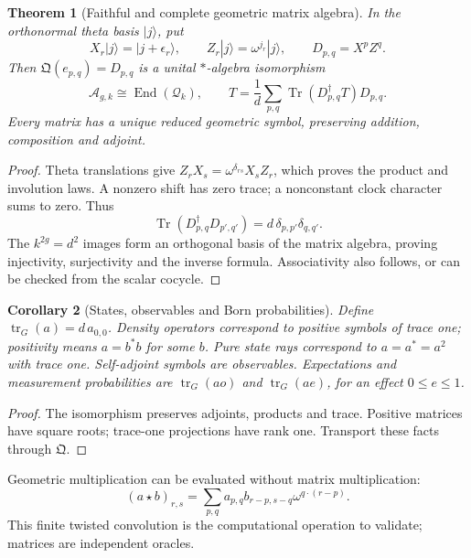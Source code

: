 \documentclass[11pt]{article}
\newtheorem{theorem}{Theorem}[section]
\newtheorem{corollary}[theorem]{Corollary}
\theoremstyle{definition}
\theoremstyle{remark}
\newcommand{\Tr}{\operatorname{Tr}}
\begin{document}
\begin{theorem}[Faithful and complete geometric matrix algebra]\label{thm:full-algebra}
In the orthonormal theta basis $|j\rangle$, put
\[
 X_r|j\rangle=|j+\epsilon_r\rangle,\qquad
 Z_r|j\rangle=\omega^{j_r}|j\rangle,\qquad D_{p,q}=X^pZ^q.
\]
Then $\mathfrak Q(e_{p,q})=D_{p,q}$ is a unital $*$-algebra isomorphism
\[
 \mathcal A_{g,k}\cong\operatorname{End}(\mathcal Q_k),\qquad
 T=\frac1d\sum_{p,q}\Tr(D_{p,q}^\dagger T)D_{p,q}.
\]
Every matrix has a unique reduced geometric symbol, preserving addition,
composition and adjoint.
\end{theorem}
\begin{proof}
Theta translations give $Z_rX_s=\omega^{\delta_{rs}}X_sZ_r$, which proves
the product and involution laws. A nonzero shift has zero trace; a
nonconstant clock character sums to zero. Thus
\[
 \Tr(D_{p,q}^\dagger D_{p',q'})=d\,\delta_{p,p'}\delta_{q,q'}.
\]
The $k^{2g}=d^2$ images form an orthogonal basis of the matrix algebra,
proving injectivity, surjectivity and the inverse formula. Associativity
also follows, or can be checked from the scalar cocycle.
\end{proof}

\begin{corollary}[States, observables and Born probabilities]\label{cor:geometric-states}
Define $\operatorname{tr}_{G}(a)=d\,a_{0,0}$. Density operators correspond
to positive symbols of trace one; positivity means $a=b^*b$ for some $b$.
Pure state rays correspond to $a=a^*=a^2$ with trace one. Self-adjoint
symbols are observables. Expectations and measurement probabilities are
$\operatorname{tr}_{G}(ao)$ and $\operatorname{tr}_{G}(ae)$, for an effect
$0\le e\le1$.
\end{corollary}
\begin{proof}
The isomorphism preserves adjoints, products and trace. Positive matrices
have square roots; trace-one projections have rank one. Transport these
facts through $\mathfrak Q$.
\end{proof}

Geometric multiplication can be evaluated without matrix multiplication:
\[
 (a\star b)_{r,s}=\sum_{p,q}a_{p,q}b_{r-p,s-q}
                 \omega^{q\cdot(r-p)}.
\]
This finite twisted convolution is the computational operation to
validate; matrices are independent oracles.
\end{document}
